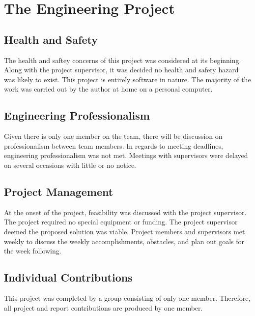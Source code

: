 \chapter{The Engineering Project}
\label{chap:project}


\section{Health and Safety}

The health and saftey concerns of this project was considered at its beginning. Along with the project supervisor, it was decided no health and safety hazard was likely to exist. This project is entirely software in nature. The majority of the work was carried out by the author at home on a personal computer.


\section{Engineering Professionalism}

Given there is only one member on the team, there will be discussion on professionalism between team members. In regards to meeting deadlines, engineering professionalism was not met. Meetings with supervisors were delayed on several occasions with little or no notice. 


\section{Project Management}

At the onset of the project, feasibility was discussed with the project supervisor. The project required no special equipment or funding. The project supervisor deemed the proposed solution was viable. Project members and supervisors met weekly to discuss the weekly accomplishments, obstacles, and plan out goals for the week following. 


\section{Individual Contributions}

This project was completed by a group consisting of only one member. Therefore, all project and report contributions are produced by one member.
